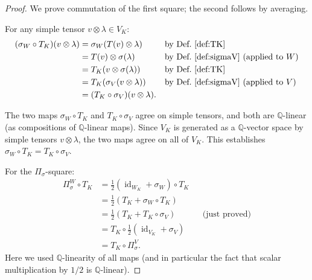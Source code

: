 \documentclass[11pt, a4paper]{amsart}
\theoremstyle{definition}
\newcommand{\Q}{\mathbb{Q}}
\newcommand{\id}{\operatorname{id}}
\begin{document}
\begin{proof}
We prove commutation of the first square; the second follows by
averaging.

For any simple tensor $v \otimes \lambda \in V_K$:
\begin{align*}
  (\sigma_W \circ T_K)(v \otimes \lambda)
  &= \sigma_W(T(v) \otimes \lambda) && \text{by Def.~\ref{def:TK}} \\
  &= T(v) \otimes \sigma(\lambda) && \text{by Def.~\ref{def:sigmaV} (applied to $W$)} \\
  &= T_K(v \otimes \sigma(\lambda)) && \text{by Def.~\ref{def:TK}} \\
  &= T_K(\sigma_V(v \otimes \lambda)) && \text{by Def.~\ref{def:sigmaV} (applied to $V$)} \\
  &= (T_K \circ \sigma_V)(v \otimes \lambda).
\end{align*}

The two maps $\sigma_W \circ T_K$ and $T_K \circ \sigma_V$ agree on
simple tensors, and both are $\Q$-linear (as compositions of
$\Q$-linear maps). Since $V_K$ is generated as a $\Q$-vector space
by simple tensors $v \otimes \lambda$, the two maps agree on all of
$V_K$. This establishes $\sigma_W \circ T_K = T_K \circ \sigma_V$.

For the $\Pi_\sigma$-square:
\begin{align*}
  \Pi_\sigma^W \circ T_K
  &= \tfrac{1}{2}(\id_{W_K} + \sigma_W) \circ T_K \\
  &= \tfrac{1}{2}(T_K + \sigma_W \circ T_K) \\
  &= \tfrac{1}{2}(T_K + T_K \circ \sigma_V) && \text{(just proved)} \\
  &= T_K \circ \tfrac{1}{2}(\id_{V_K} + \sigma_V) \\
  &= T_K \circ \Pi_\sigma^V.
\end{align*}
Here we used $\Q$-linearity of all maps (and in particular the
fact that scalar multiplication by $1/2$ is $\Q$-linear).
\end{proof}
\end{document}
